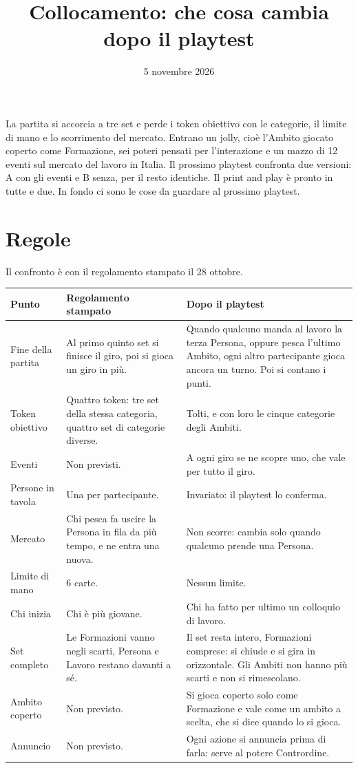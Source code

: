 \documentclass[11pt,a4paper]{article}
\title{Collocamento: che cosa cambia dopo il playtest}
\date{5 novembre 2026}
\begin{document}
\maketitle

La partita si accorcia a tre set e perde i token obiettivo con le categorie, il limite di mano e lo scorrimento
del mercato. Entrano un jolly, cioè l'Ambito giocato coperto come Formazione, sei poteri pensati per
l'interazione e un mazzo di 12 eventi sul mercato del lavoro in Italia. Il prossimo playtest confronta due
versioni: A con gli eventi e B senza, per il resto identiche. Il print and play è pronto in tutte e due. In fondo
ci sono le cose da guardare al prossimo playtest.

\section{Regole}

Il confronto è con il regolamento stampato il 28 ottobre.

{\small
\begin{tabularx}{\textwidth}{@{}P{2.8cm}LL@{}}
\toprule
Punto & Regolamento stampato & Dopo il playtest \\
\midrule
Fine della partita & Al primo quinto set si finisce il giro, poi si gioca un giro in più. & Quando qualcuno manda al lavoro la terza Persona, oppure pesca l'ultimo Ambito, ogni altro partecipante gioca ancora un turno. Poi si contano i punti. \\
Token obiettivo & Quattro token: tre set della stessa categoria, quattro set di categorie diverse. & Tolti, e con loro le cinque categorie degli Ambiti. \\
Eventi & Non previsti. & A ogni giro se ne scopre uno, che vale per tutto il giro. \\
Persone in tavola & Una per partecipante. & Invariato: il playtest lo conferma. \\
Mercato & Chi pesca fa uscire la Persona in fila da più tempo, e ne entra una nuova. & Non scorre: cambia solo quando qualcuno prende una Persona. \\
Limite di mano & 6 carte. & Nessun limite. \\
Chi inizia & Chi è più giovane. & Chi ha fatto per ultimo un colloquio di lavoro. \\
Set completo & Le Formazioni vanno negli scarti, Persona e Lavoro restano davanti a sé. & Il set resta intero, Formazioni comprese: si chiude e si gira in orizzontale. Gli Ambiti non hanno più scarti e non si rimescolano. \\
Ambito coperto & Non previsto. & Si gioca coperto solo come Formazione e vale come un ambito a scelta, che si dice quando lo si gioca. \\
Annuncio & Non previsto. & Ogni azione si annuncia prima di farla: serve al potere Contrordine. \\
\bottomrule
\end{tabularx}
}
\end{document}
